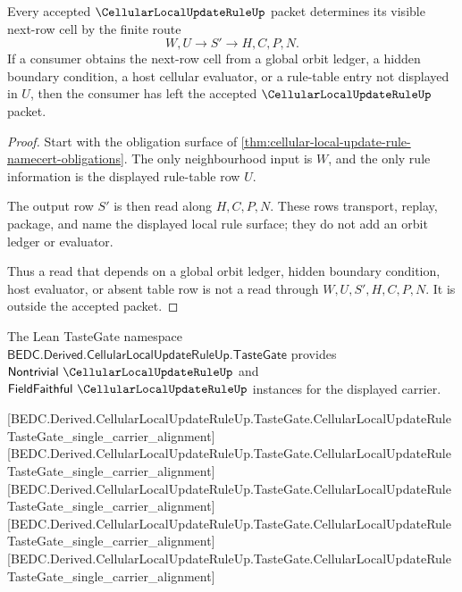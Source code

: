 \begin{theorem}
\label{thm:cellular-local-update-rule-falsifiable-boundary}
Every accepted $\CellularLocalUpdateRuleUp$ packet determines its visible next-row cell by the finite route
$$
W,U \longrightarrow S' \longrightarrow H,C,P,N.
$$
If a consumer obtains the next-row cell from a global orbit ledger, a hidden boundary condition, a host cellular evaluator, or a rule-table entry not displayed in $U$, then the consumer has left the accepted $\CellularLocalUpdateRuleUp$ packet.
\end{theorem}
\begin{proof}
Start with the obligation surface of \autoref{thm:cellular-local-update-rule-namecert-obligations}. The only neighbourhood input is $W$, and the only rule information is the displayed rule-table row $U$.

The output row $S'$ is then read along $H,C,P,N$. These rows transport, replay, package, and name the displayed local rule surface; they do not add an orbit ledger or evaluator.

Thus a read that depends on a global orbit ledger, hidden boundary condition, host evaluator, or absent table row is not a read through $W,U,S',H,C,P,N$. It is outside the accepted packet.
\end{proof}

The Lean TasteGate namespace $\mathsf{BEDC.Derived.CellularLocalUpdateRuleUp.TasteGate}$ provides $\mathsf{Nontrivial}\ \CellularLocalUpdateRuleUp$ and $\mathsf{FieldFaithful}\ \CellularLocalUpdateRuleUp$ instances for the displayed carrier.

[BEDC.Derived.CellularLocalUpdateRuleUp.TasteGate.CellularLocalUpdateRuleTasteGate\_single\_carrier\_alignment]
[BEDC.Derived.CellularLocalUpdateRuleUp.TasteGate.CellularLocalUpdateRuleTasteGate\_single\_carrier\_alignment]
[BEDC.Derived.CellularLocalUpdateRuleUp.TasteGate.CellularLocalUpdateRuleTasteGate\_single\_carrier\_alignment]
[BEDC.Derived.CellularLocalUpdateRuleUp.TasteGate.CellularLocalUpdateRuleTasteGate\_single\_carrier\_alignment]
[BEDC.Derived.CellularLocalUpdateRuleUp.TasteGate.CellularLocalUpdateRuleTasteGate\_single\_carrier\_alignment]

